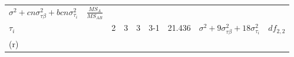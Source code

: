 \documentclass[12pt,]{article}
\begin{document}
\begin{longtable}[]{@{}lllllllll@{}}
\begin{minipage}[t]{0.21\columnwidth}
\(\sigma^2+cn\sigma^2_{\tau\beta}+bcn\sigma^2_{\tau_{i}}\)\strut
\end{minipage} & \begin{minipage}[t]{0.09\columnwidth}\raggedright
\(\frac{MS_{A}}{MS_{AB}}\)\strut
\end{minipage}\tabularnewline
\begin{minipage}[t]{0.06\columnwidth}\raggedright
\(\tau_{i}\)\strut
\end{minipage} & \begin{minipage}[t]{0.03\columnwidth}\raggedright
\strut
\end{minipage} & \begin{minipage}[t]{0.03\columnwidth}\raggedright
2\strut
\end{minipage} & \begin{minipage}[t]{0.03\columnwidth}\raggedright
3\strut
\end{minipage} & \begin{minipage}[t]{0.03\columnwidth}\raggedright
3\strut
\end{minipage} & \begin{minipage}[t]{0.12\columnwidth}\raggedright
3-1\strut
\end{minipage} & \begin{minipage}[t]{0.15\columnwidth}\raggedright
21.436\strut
\end{minipage} & \begin{minipage}[t]{0.21\columnwidth}\raggedright
\(\sigma^2+9\sigma^2_{\tau\beta}+18\sigma^2_{\tau_{i}}\)\strut
\end{minipage} & \begin{minipage}[t]{0.09\columnwidth}\raggedright
\(df_{2,2}\)\strut
\end{minipage}\tabularnewline
\begin{minipage}[t]{0.06\columnwidth}\raggedright
(r)\strut
\end{minipage} & \begin{minipage}[t]{0.03\columnwidth}\raggedright
\strut
\end{minipage} & \begin{minipage}[t]{0.03\columnwidth}\raggedright
\strut
\end{minipage} & \begin{minipage}[t]{0.03\columnwidth}\raggedright
\strut
\end{minipage} & \begin{minipage}[t]{0.03\columnwidth}\raggedright
\strut
\end{minipage} & \begin{minipage}[t]{0.12\columnwidth}\raggedright

\end{minipage}
\end{longtable}
\end{document}
